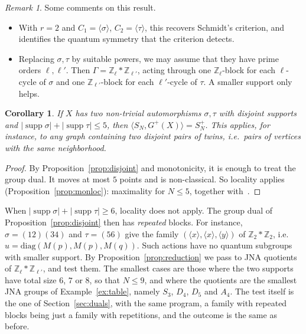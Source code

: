 \documentclass[11pt]{amsart}
\newtheorem{corollary}[theorem]{Corollary}
\theoremstyle{definition}
\theoremstyle{remark}
\newtheorem{remark}[theorem]{Remark}
\theoremstyle{plain}
\numberwithin{equation}{section}
\numberwithin{table}{section}
\newcommand{\Z}{\mathbb Z}
\DeclareMathOperator{\supp}{supp}
\begin{document}
\begin{remark}
Some comments on this result.
\begin{itemize}
\item With $r=2$ and $C_1=\langle\sigma\rangle$, $C_2=\langle\tau\rangle$, this recovers Schmidt's criterion, and identifies the quantum symmetry that the criterion detects.
\item Replacing $\sigma,\tau$ by suitable powers, we may assume that they have prime orders $\ell,\ell'$. Then $\Gamma=\Z_\ell*\Z_{\ell'}$, acting through one $\Z_\ell$-block for each $\ell$-cycle of $\sigma$ and one $\Z_{\ell'}$-block for each $\ell'$-cycle of $\tau$. A smaller support only helps.
\end{itemize}
\end{remark}

\begin{corollary}\label{cor:small}
If $X$ has two non-trivial automorphisms $\sigma,\tau$ with disjoint supports and $|\supp\sigma|+|\supp\tau|\le5$, then $\langle S_N,G^+(X)\rangle=S_N^+$. This applies, for instance, to any graph containing two disjoint pairs of twins, i.e.\ pairs of vertices with the same neighborhood.
\end{corollary}

\begin{proof}
By Proposition~\ref{prop:disjoint} and monotonicity, it is enough to treat the group dual. It moves at most $5$ points and is non-classical. So locality applies (Proposition~\ref{prop:monloc}): maximality for $N\le5$, together with~\cite[Cor.~3.4]{bcf}.
\end{proof}

When $|\supp\sigma|+|\supp\tau|\ge6$, locality does not apply. The group dual of Proposition~\ref{prop:disjoint} then has \emph{repeated} blocks. For instance, $\sigma=(12)(34)$ and $\tau=(56)$ give the family $(\langle x\rangle,\langle x\rangle,\langle y\rangle)$ of $\Z_2*\Z_2$, i.e.\ $u=\mathrm{diag}(M(p),M(p),M(q))$. Such actions have no quantum subgroups with smaller support. By Proposition~\ref{prop:reduction} we pass to JNA quotients of $\Z_\ell*\Z_{\ell'}$, and test them. The smallest cases are those where the two supports have total size $6$, $7$ or $8$, so that $N\le9$, and where the quotients are the smallest JNA groups of Example~\ref{ex:table}, namely $S_3$, $D_4$, $D_5$ and $A_4$. The test itself is the one of Section~\ref{sec:duals}, with the same program, a family with repeated blocks being just a family with repetitions, and the outcome is the same as before.
\end{document}
